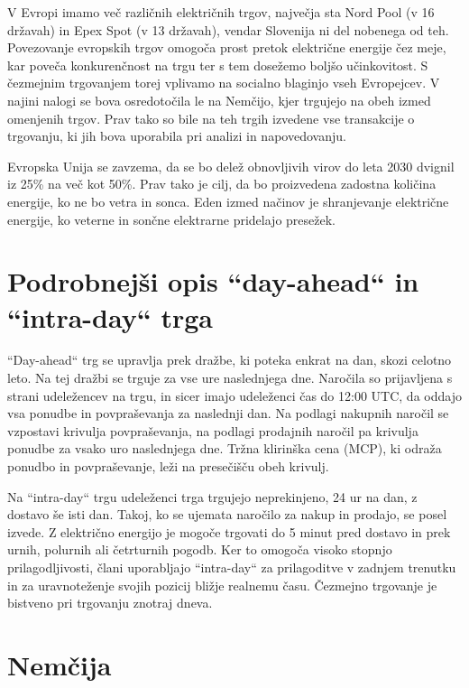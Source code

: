 \documentclass[12pt,a4paper]{amsart}
\theoremstyle{definition} %
\theoremstyle{plain} %
\begin{document}
{V Evropi imamo več različnih električnih trgov, največja sta Nord Pool (v 16 državah) in Epex Spot (v 13 državah), vendar Slovenija ni del nobenega od teh. 
Povezovanje evropskih trgov omogoča prost pretok električne energije čez meje, kar poveča konkurenčnost na trgu ter s tem dosežemo boljšo učinkovitost. S čezmejnim trgovanjem torej vplivamo na socialno blaginjo vseh Evropejcev.
V najini nalogi se bova osredotočila le na 
Nemčijo, kjer trgujejo na obeh izmed omenjenih trgov. Prav tako so bile na teh trgih izvedene vse transakcije o trgovanju, ki jih bova uporabila pri analizi in napovedovanju.  





Evropska Unija se zavzema, da se bo delež obnovljivih virov do leta 2030 dvignil iz 25\% na več kot 50\%. Prav tako je cilj, da bo proizvedena zadostna količina energije, ko ne bo vetra in sonca. 
Eden izmed načinov je shranjevanje električne energije, ko veterne in sončne elektrarne pridelajo presežek. 


\section*{Podrobnejši opis ``day-ahead`` in ``intra-day`` trga}

``Day-ahead`` trg se upravlja prek dražbe, ki poteka enkrat na dan, skozi celotno leto. Na tej dražbi se trguje za vse ure naslednjega dne. Naročila so prijavljena s strani udeležencev na trgu, 
in sicer imajo udeleženci čas do 12:00 UTC, da oddajo vsa ponudbe in povpraševanja za naslednji dan. Na podlagi nakupnih naročil se vzpostavi krivulja povpraševanja, na podlagi prodajnih naročil pa krivulja ponudbe za vsako uro naslednjega dne. Tržna klirinška cena (MCP), ki odraža ponudbo in povpraševanje, leži na presečišču obeh krivulj.


Na ``intra-day`` trgu udeleženci trga trgujejo neprekinjeno, 24 ur na dan, z dostavo še isti dan. Takoj, ko se ujemata naročilo za nakup in prodajo, se posel izvede. Z električno energijo je mogoče trgovati do 5 minut pred dostavo in prek urnih, polurnih ali četrturnih pogodb. Ker to omogoča visoko stopnjo prilagodljivosti, člani uporabljajo ``intra-day`` za prilagoditve v zadnjem trenutku in za uravnoteženje svojih pozicij bližje realnemu času. Čezmejno trgovanje je bistveno pri trgovanju znotraj dneva. 



\section*{Nemčija}

}
\end{document}
